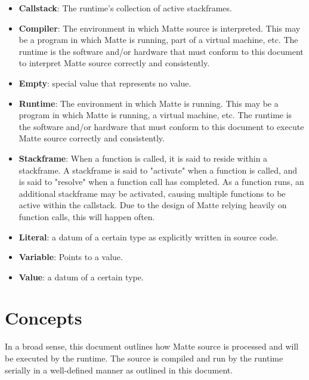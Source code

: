 \documentclass[12pt,letterpaper]{report}
\begin{document}
\begin{itemize}

\item \textbf{Callstack}: The runtime's collection of active stackframes.

\item \textbf{Compiler}: The environment in which Matte source is interpreted. This may be a program in which Matte is running, part of a virtual machine, etc. The runtime is the software and/or hardware that must conform to this document to interpret Matte source correctly and consistently.

\item \textbf{Empty}: special value that represents no value. 

\item \textbf{Runtime}: The environment in which Matte is running. This may be a program in which Matte is running, a virtual machine, etc. The runtime is the software and/or hardware that must conform to this document to execute Matte source correctly and consistently.

\item \textbf{Stackframe}: When a function is called, it is said to reside within a stackframe. A stackframe is said to "activate" when a function is called, and is said to "resolve" when a function call has completed. As a function runs, an additional stackframe may be activated, causing multiple functions to be active within the callstack. Due to the design of Matte relying heavily on function calls, this will happen often.

\item \textbf{Literal}: a datum of a certain type as explicitly written in source code.

\item \textbf{Variable}: Points to a value.

\item \textbf{Value}: a datum of a certain type.
\end{itemize}

\section{Concepts}\label{Concepts}

In a broad sense, this document outlines how Matte source is processed and will be 
executed by the runtime. The source is compiled and run by the runtime serially 
in a well-defined manner as outlined in this document. 
\end{document}
